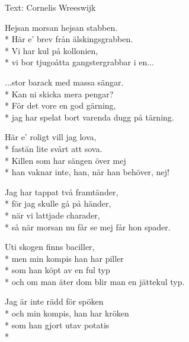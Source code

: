 \begin{SongText}
    \begin{SongInfo}
        Text: Cornelis Wreeswijk
    \end{SongInfo}
    \begin{SongVerse}
        Hejsan morsan hejsan stabben.\\*%
        Här e’ brev från älskingsgrabben.\\*%
        Vi har kul på kollonien,\\*%
        vi bor tjugoåtta gangstergrabbar i en...
    \end{SongVerse}
    \begin{SongVerse}
        ...stor barack med massa sängar.\\*%
        Kan ni skicka mera pengar?\\*%
        För det vore en god gärning,\\*%
        jag har spelat bort varenda dugg på tärning.
    \end{SongVerse}
    \begin{SongVerse}
        Här e’ roligt vill jag lova,\\*%
        fastän lite svårt att sova.\\*%
        Killen som har sängen över mej\\*%
        han vaknar inte, han, när han behöver, nej!
    \end{SongVerse}
    \begin{SongVerse}
        Jag har tappat två framtänder,\\*%
        för jag skulle gå på händer,\\*%
        när vi lattjade charader,\\*%
        så när morsan nu får se mej får hon spader.
    \end{SongVerse}
    \begin{SongVerse}
        Uti skogen finns baciller,\\*%
        men min kompis han har piller\\*%
        som han köpt av en ful typ\\*%
        och om man äter dom blir man en jättekul typ.
    \end{SongVerse}
    \begin{SongVerse}
        Jag är inte rädd för spöken\\*%
        och min kompis, han har kröken\\*%
        som han gjort utav potatis\\*%

\end{SongVerse}
\end{SongText}
